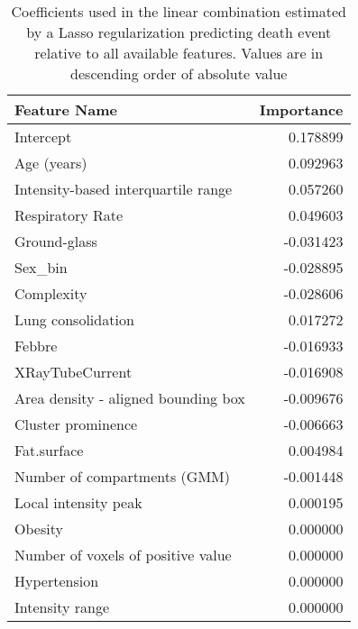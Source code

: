 \begin{table}
	\caption{Coefficients used in the linear combination estimated by a Lasso regularization predicting death event relative to all available features. Values are in descending order of absolute value\label{tab:ParamAll}}
		\centering
			\begin{tabular}{lr}
			\toprule
			Feature Name &  Importance \\
			\midrule
			Intercept                           &                      0.178899 \\
			Age (years)                         &                      0.092963 \\
			Intensity-based interquartile range &                      0.057260 \\
			Respiratory Rate                    &                      0.049603 \\
			Ground-glass                        &                     -0.031423 \\
			Sex\_bin                             &                     -0.028895 \\
			Complexity                          &                     -0.028606 \\
			Lung consolidation                  &                      0.017272 \\
			Febbre                              &                     -0.016933 \\
			XRayTubeCurrent                     &                     -0.016908 \\
			Area density - aligned bounding box &                     -0.009676 \\
			Cluster prominence                  &                     -0.006663 \\
			Fat.surface                         &                      0.004984 \\
			Number of compartments (GMM)        &                     -0.001448 \\
			Local intensity peak                &                      0.000195 \\
			Obesity                             &                      0.000000 \\
			Number of voxels of positive value  &                      0.000000 \\
			Hypertension                        &                      0.000000 \\
			Intensity range                     &                      0.000000 \\

\end{tabular}
\end{table}
